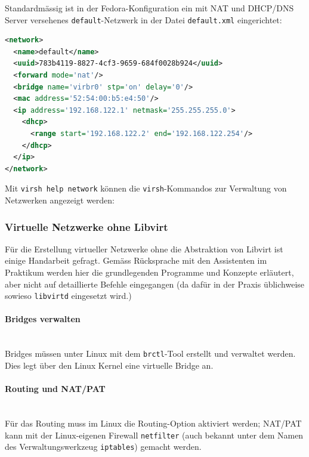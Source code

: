 Standardmässig ist in der Fedora-Konfiguration ein mit NAT und DHCP/DNS Server versehenes \lstinline|default|-Netzwerk in der Datei \lstinline|default.xml| eingerichtet:

\begin{lstlisting}[caption=default.xml,language=xml]
<network>
  <name>default</name>
  <uuid>783b4119-8827-4cf3-9659-684f0028b924</uuid>
  <forward mode='nat'/>
  <bridge name='virbr0' stp='on' delay='0'/>
  <mac address='52:54:00:b5:e4:50'/>
  <ip address='192.168.122.1' netmask='255.255.255.0'>
    <dhcp>
      <range start='192.168.122.2' end='192.168.122.254'/>
    </dhcp>
  </ip>
</network>
\end{lstlisting}

Mit \lstinline|virsh help network| können die \lstinline|virsh|-Kommandos zur Verwaltung von Netzwerken angezeigt werden:





\subsubsection{Virtuelle Netzwerke ohne Libvirt}

Für die Erstellung virtueller Netzwerke ohne die Abstraktion von Libvirt ist einige Handarbeit gefragt. Gemäss Rücksprache mit den Assistenten im Praktikum werden hier die grundlegenden Programme und Konzepte erläutert, aber nicht auf detaillierte Befehle eingegangen (da dafür in der Praxis üblichweise sowieso \lstinline|libvirtd| eingesetzt wird.)

\paragraph{Bridges verwalten} \hfill \\
Bridges müssen unter Linux mit dem \lstinline|brctl|-Tool erstellt und verwaltet werden. Dies legt über den Linux Kernel eine virtuelle Bridge an.

\paragraph{Routing und NAT/PAT} \hfill \\
Für das Routing muss im Linux die Routing-Option aktiviert werden; NAT/PAT kann mit der Linux-eigenen Firewall \lstinline|netfilter| (auch bekannt unter dem Namen des Verwaltungswerkzeug \lstinline|iptables|) gemacht werden.

